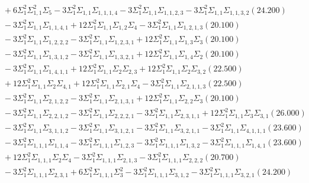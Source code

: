 \documentclass[12pt]{article}
\begin{document}
\begin{landscape}
\begin{align*}
		&\quad\quad +6\Sigma_{1}^{2}\Sigma_{1,1}^{2}\Sigma_{5}-3\Sigma_{1}^{2}\Sigma_{1,1}\Sigma_{1,1,1,4}-3\Sigma_{1}^{2}\Sigma_{1,1}\Sigma_{1,1,2,3}-3\Sigma_{1}^{2}\Sigma_{1,1}\Sigma_{1,1,3,2}(24.200) \\ 
		&\quad\quad -3\Sigma_{1}^{2}\Sigma_{1,1}\Sigma_{1,1,4,1}+12\Sigma_{1}^{2}\Sigma_{1,1}\Sigma_{1,2}\Sigma_{4}-3\Sigma_{1}^{2}\Sigma_{1,1}\Sigma_{1,2,1,3}(20.100) \\ 
		&\quad\quad -3\Sigma_{1}^{2}\Sigma_{1,1}\Sigma_{1,2,2,2}-3\Sigma_{1}^{2}\Sigma_{1,1}\Sigma_{1,2,3,1}+12\Sigma_{1}^{2}\Sigma_{1,1}\Sigma_{1,3}\Sigma_{3}(20.100) \\ 
		&\quad\quad -3\Sigma_{1}^{2}\Sigma_{1,1}\Sigma_{1,3,1,2}-3\Sigma_{1}^{2}\Sigma_{1,1}\Sigma_{1,3,2,1}+12\Sigma_{1}^{2}\Sigma_{1,1}\Sigma_{1,4}\Sigma_{2}(20.100) \\ 
		&\quad\quad -3\Sigma_{1}^{2}\Sigma_{1,1}\Sigma_{1,4,1,1}+12\Sigma_{1}^{2}\Sigma_{1,1}\Sigma_{2}\Sigma_{2,3}+12\Sigma_{1}^{2}\Sigma_{1,1}\Sigma_{2}\Sigma_{3,2}(22.500) \\ 
		&\quad\quad +12\Sigma_{1}^{2}\Sigma_{1,1}\Sigma_{2}\Sigma_{4,1}+12\Sigma_{1}^{2}\Sigma_{1,1}\Sigma_{2,1}\Sigma_{4}-3\Sigma_{1}^{2}\Sigma_{1,1}\Sigma_{2,1,1,3}(22.500) \\ 
		&\quad\quad -3\Sigma_{1}^{2}\Sigma_{1,1}\Sigma_{2,1,2,2}-3\Sigma_{1}^{2}\Sigma_{1,1}\Sigma_{2,1,3,1}+12\Sigma_{1}^{2}\Sigma_{1,1}\Sigma_{2,2}\Sigma_{3}(20.100) \\ 
		&\quad\quad -3\Sigma_{1}^{2}\Sigma_{1,1}\Sigma_{2,2,1,2}-3\Sigma_{1}^{2}\Sigma_{1,1}\Sigma_{2,2,2,1}-3\Sigma_{1}^{2}\Sigma_{1,1}\Sigma_{2,3,1,1}+12\Sigma_{1}^{2}\Sigma_{1,1}\Sigma_{3}\Sigma_{3,1}(26.000) \\ 
		&\quad\quad -3\Sigma_{1}^{2}\Sigma_{1,1}\Sigma_{3,1,1,2}-3\Sigma_{1}^{2}\Sigma_{1,1}\Sigma_{3,1,2,1}-3\Sigma_{1}^{2}\Sigma_{1,1}\Sigma_{3,2,1,1}-3\Sigma_{1}^{2}\Sigma_{1,1}\Sigma_{4,1,1,1}(23.600) \\ 
		&\quad\quad -3\Sigma_{1}^{2}\Sigma_{1,1,1}\Sigma_{1,1,4}-3\Sigma_{1}^{2}\Sigma_{1,1,1}\Sigma_{1,2,3}-3\Sigma_{1}^{2}\Sigma_{1,1,1}\Sigma_{1,3,2}-3\Sigma_{1}^{2}\Sigma_{1,1,1}\Sigma_{1,4,1}(23.600) \\ 
		&\quad\quad +12\Sigma_{1}^{2}\Sigma_{1,1,1}\Sigma_{2}\Sigma_{4}-3\Sigma_{1}^{2}\Sigma_{1,1,1}\Sigma_{2,1,3}-3\Sigma_{1}^{2}\Sigma_{1,1,1}\Sigma_{2,2,2}(20.700) \\ 
		&\quad\quad -3\Sigma_{1}^{2}\Sigma_{1,1,1}\Sigma_{2,3,1}+6\Sigma_{1}^{2}\Sigma_{1,1,1}\Sigma_{3}^{2}-3\Sigma_{1}^{2}\Sigma_{1,1,1}\Sigma_{3,1,2}-3\Sigma_{1}^{2}\Sigma_{1,1,1}\Sigma_{3,2,1}(24.200) \\ 

\end{align*}
\end{landscape}
\end{document}
